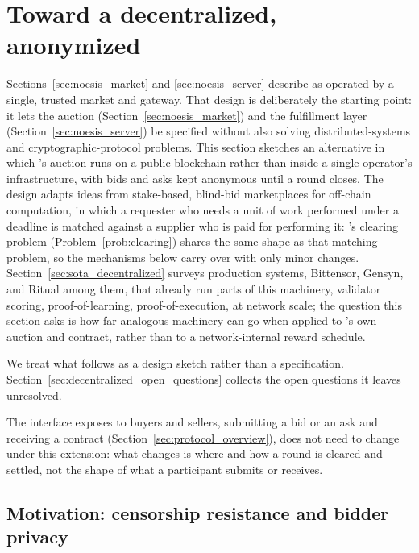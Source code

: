 \section{Toward a decentralized, anonymized \NoesisMarket{}}
\label{sec:decentralized_extension}

Sections~\ref{sec:noesis_market} and \ref{sec:noesis_server} describe \Noesis{}
as operated by a single, trusted market and gateway. That design is
deliberately the starting point: it lets the auction
(Section~\ref{sec:noesis_market}) and the fulfillment layer
(Section~\ref{sec:noesis_server}) be specified without also solving
distributed-systems and cryptographic-protocol problems.
%
This section sketches an alternative in which \NoesisMarket's auction runs on a
public blockchain rather than inside a single operator's infrastructure, with
bids and asks kept anonymous until a round closes. The design adapts ideas
from stake-based, blind-bid marketplaces for off-chain computation, in
which a requester who needs a unit of work performed under a deadline is
matched against a supplier who is paid for performing it:
\NoesisMarket's clearing problem (Problem~\ref{prob:clearing}) shares the
same shape as that matching problem, so the mechanisms below carry over
with only minor changes. Section~\ref{sec:sota_decentralized} surveys
production systems, Bittensor, Gensyn, and Ritual among them, that already
run parts of this machinery, validator scoring, proof-of-learning,
proof-of-execution, at network scale; the question this section asks is
how far analogous machinery can go when applied to \NoesisMarket's own
auction and contract, rather than to a network-internal reward schedule.

We treat what follows as a design sketch rather than a specification.
Section~\ref{sec:decentralized_open_questions} collects the open
questions it leaves unresolved.

The interface \Noesis{} exposes to buyers and sellers, submitting a bid
or an ask and receiving a contract (Section~\ref{sec:protocol_overview}),
does not need to change under this extension: what changes is where and
how a round is cleared and settled, not the shape of what a participant
submits or receives.

\subsection{Motivation: censorship resistance and bidder privacy}
\label{sec:decentralized_motivation}

